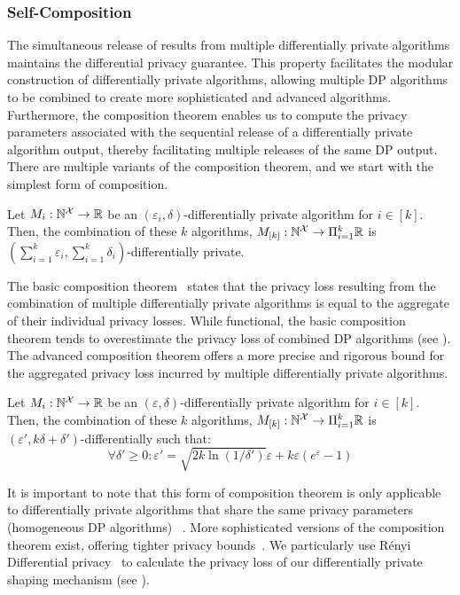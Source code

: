 \subsubsection{Self-Composition}\label{subsubsec:background-dp-composition}
The simultaneous release of results from multiple differentially private algorithms maintains the differential privacy guarantee.
This property facilitates the modular construction of differentially private algorithms, allowing multiple DP algorithms to be combined to create more sophisticated and advanced algorithms.
Furthermore, the composition theorem enables us to compute the privacy parameters associated with the sequential release of a differentially private algorithm output, thereby facilitating multiple releases of the same DP output.
There are multiple variants of the composition theorem, and we start with the simplest form of composition.
\begin{proposition}
\label{prop:basic-composition}
  Let $M_i: \mathbb{N}^\mathcal{X} \rightarrow \mathbb{R}$ be an $(\varepsilon_i, \delta)$-differentially private algorithm for $i \in [k]$. Then, the combination of these $k$ algorithms, $M_{[k]}: \mathbb{N}^\mathcal{X} \rightarrow \Pi_{i=1}^{k}\mathbb{R}$ is $(\sum_{i=1}^{k}\varepsilon_i, \sum_{i=1}^{k}\delta_i)$-differentially private.  
\end{proposition}
The basic composition theorem~\cite{dwork2014algorithmic} states that the privacy loss resulting from the combination of multiple differentially private algorithms is equal to the aggregate of their individual privacy losses.
While functional, the basic composition theorem tends to overestimate the privacy loss of combined DP algorithms (see ).
The advanced composition theorem offers a more precise and rigorous bound for the aggregated privacy loss incurred by multiple differentially private algorithms. 
\begin{proposition}
\label{prop:advanced-composition}
  Let $M_i: \mathbb{N}^\mathcal{X} \rightarrow \mathbb{R}$ be an $(\varepsilon, \delta)$-differentially private algorithm for $i \in [k]$. Then, the combination of these $k$ algorithms, $M_{[k]}: \mathbb{N}^\mathcal{X} \rightarrow \Pi_{i=1}^{k}\mathbb{R}$ is $(\varepsilon', k\delta+\delta')$-differentially such that:
  \begin{equation*}
    \forall \delta' \geq 0: \varepsilon' = \sqrt{2k\ln(1/\delta')}\varepsilon + k\varepsilon(e^{\varepsilon} - 1)
  \end{equation*}
\end{proposition}
It is important to note that this form of composition theorem is only applicable to differentially private algorithms that share the same privacy parameters (\ie homogeneous DP algorithms) ~\cite{mironov2017renyi}.
More sophisticated versions of the composition theorem exist, offering tighter privacy bounds~\cite{kairouz2015composition, mironov2017renyi}.
We particularly use R{\'e}nyi Differential privacy~\cite{mironov2017renyi} to calculate the privacy loss of our differentially private shaping mechanism (see ).

